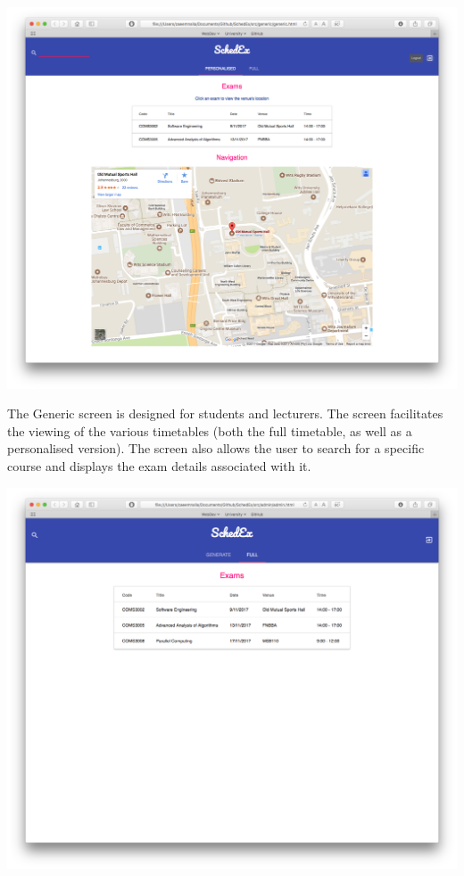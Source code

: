 \documentclass{article}
\begin{document}
\centerline{\includegraphics[scale=0.4]{generic_personalised}}


The Generic screen is designed for students and lecturers. The screen facilitates the viewing of the various timetables (both the full timetable, as well as a personalised version). The screen also allows the user to search for a specific course and displays the exam details associated with it.

\centerline{\includegraphics[scale=0.4]{admin_full}}
\end{document}
